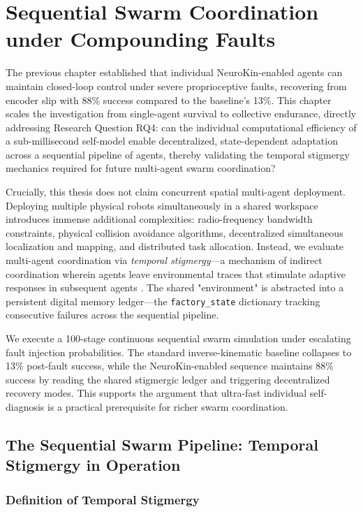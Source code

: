 ﻿\documentclass[12pt,a4paper,oneside]{report}
\begin{document}
\chapter{Sequential Swarm Coordination under Compounding Faults}

The previous chapter established that individual NeuroKin-enabled agents can maintain closed-loop control under severe proprioceptive faults, recovering from encoder slip with 88\% success compared to the baseline's 13\%. This chapter scales the investigation from single-agent survival to collective endurance, directly addressing Research Question RQ4: can the individual computational efficiency of a sub-millisecond self-model enable decentralized, state-dependent adaptation across a sequential pipeline of agents, thereby validating the temporal stigmergy mechanics required for future multi-agent swarm coordination?

Crucially, this thesis does not claim concurrent spatial multi-agent deployment. Deploying multiple physical robots simultaneously in a shared workspace introduces immense additional complexities: radio-frequency bandwidth constraints, physical collision avoidance algorithms, decentralized simultaneous localization and mapping, and distributed task allocation. Instead, we evaluate multi-agent coordination via \textit{temporal stigmergy}---a mechanism of indirect coordination wherein agents leave environmental traces that stimulate adaptive responses in subsequent agents \cite{bongard2006resilient}. The shared "environment" is abstracted into a persistent digital memory ledger---the \texttt{factory\_state} dictionary tracking consecutive failures across the sequential pipeline.

We execute a 100-stage continuous sequential swarm simulation under escalating fault injection probabilities. The standard inverse-kinematic baseline collapses to 13\% post-fault success, while the NeuroKin-enabled sequence maintains 88\% success by reading the shared stigmergic ledger and triggering decentralized recovery modes. This supports the argument that ultra-fast individual self-diagnosis is a practical prerequisite for richer swarm coordination.

\section{The Sequential Swarm Pipeline: Temporal Stigmergy in Operation}

\subsection{Definition of Temporal Stigmergy}
\end{document}
